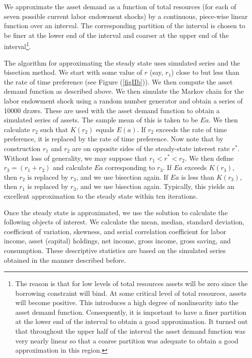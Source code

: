 \documentclass[12pt]{article}
\theoremstyle{definition}
\begin{document}
We approximate the asset demand as a function of total resources (for each of seven possible current labor endowment shocks) by a continuous, piece-wise linear function over an interval. The corresponding partition of the interval is chosen to be finer at the lower end of the interval and coarser at the upper end of the interval\footnote{The reason is that for low levels of total resources assets will be zero since the borrowing constraint will bind. At some critical level of total resources, assets will become positive. This introduces a high degree of nonlinearity into the asset demand function. Consequently, it is important to have a finer partition at the lower end of the interval to obtain a good approximation. It turned out that throughout the upper half of the interval the asset demand function was very nearly linear so that a coarse partition was adequate to obtain a good approximation in this region.}. 

The algorithm for approximating the steady state uses simulated series and the bisection method. We start with some value of $r$ (say, $r_1$) close to but less than the rate of time preference (see Figure (\ref{figIIb})). 
We then compute the asset demand function as described above. We then simulate the Markov chain for the labor endowment shock using a random number generator and obtain a series of 10000 draws. These are used with the asset demand function to obtain a simulated series of assets. The sample mean of this is taken to be $Ea$. 
We then calculate $r_2$ such that $K(r_2)$ equals $E(a)$. If $r_2$ exceeds the rate of time preference, it is replaced by the rate of time preference. Now note that by construction $r_1$ and $r_2$ are on opposite sides of the steady-state interest rate $r^*$. Without loss of generality, we may suppose that $r_1<r^*<r_2$. We then define $r_3 = (r_1 + r_2)$ and calculate $Ea$ corresponding to $r_3$. If $Ea$ exceeds $K(r_3)$, then $r_2$ is replaced by $r_3$, and we use bisection again. If $Ea$ is less than $K(r_3)$, then $r_1$ is replaced by $r_3$, and we use bisection again. Typically, this yields an excellent approximation to the steady state within ten iterations.

Once the steady state is approximated, we use the solution to calculate the following objects of interest. We calculate the mean, median, standard deviation, coefficient of variation, skewness, and serial correlation coefficient for labor income, asset (capital) holdings, net income, gross income, gross saving, and consumption. These descriptive statistics are based on the simulated series obtained in the manner described before.
\end{document}
